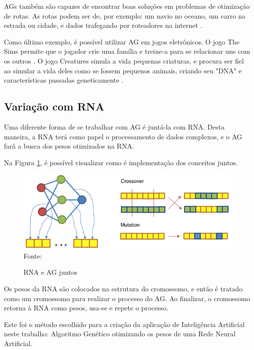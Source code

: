 \documentclass[
	12pt,					%
	openright,				%
	oneside,				%
	a4paper,				%
	bibjustif,				%
	chapter=TITLE,			%
	english,				%
	brazil,					%
	]{abntex2}
\newcommand{\source}[1]{\small Fonte: {#1}}
\begin{document}
	AGs também são capazes de encontrar boas soluções em problemas de otimização de rotas.
	As rotas podem ser de, por exemplo:
	um navio no oceano,
	um carro na estrada ou cidade,
	e dados trafegando por roteadores na internet
	\cite{brainz}.
	
	Como último exemplo,
	é possível utilizar AG em jogos eletrônicos.
	O jogo The Sims permite que o jogador crie uma família e treine-a para se relacionar uns com os outros
	\cite{brainz}.
	O jogo Creatures simula a vida pequenas criaturas,
	e procura ser fiel ao simular a vida deles como se fossem pequenos animais,
	criando seu "DNA"{} e características passadas geneticamente
	\cite{aigamedev}.
	
	\FloatBarrier
	\subsection{Variação com RNA}
	Uma diferente forma de se trabalhar com AG é juntá-la com RNA.
	Desta maneira, a RNA terá como papel o processamento de dados complexos,
	e o AG fará a busca dos pesos otimizados na RNA.
	
	Na Figura \ref{fig:nn-ag}, é possível visualizar como é implementação dos conceitos juntos.
	
	\begin{figure}[ht!]
		\centering
		\caption{RNA e AG juntos}
		\includegraphics[scale=0.7]{img/NeuralNetworkIntoChromosome.png}\\
		\vspace{0.5mm}
		\source{}
		\label{fig:nn-ag}
	\end{figure}
	
	Os pesos da RNA são colocados na estrutura do cromossomo,
	e então é tratado como um cromossomo para realizar o processo do AG.
	Ao finalizar, o cromossomo retorna à RNA como pesos,
	usa-se e repete o processo.
	
	Este foi o método escolhido para a criação da aplicação de Inteligência Artificial neste trabalho:
	Algoritmo Genético otimizando os pesos de uma Rede Neural Artificial.
\end{document}
